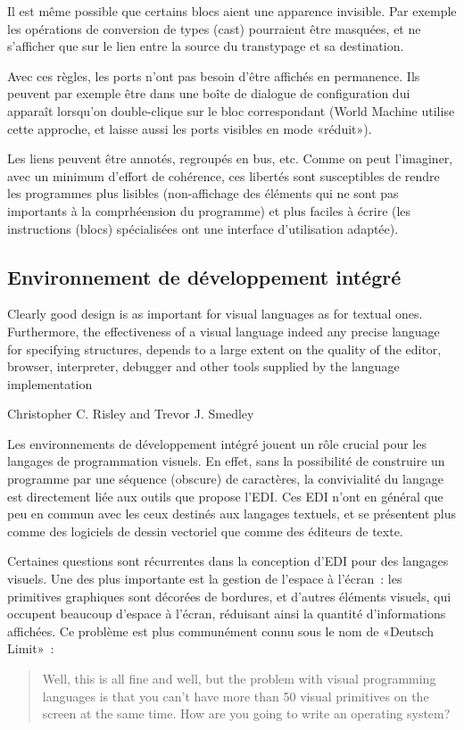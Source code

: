 \documentclass{article}
\begin{document}
Il est même possible que certains blocs aient une apparence invisible. Par exemple les opérations de conversion de types (cast) pourraient
être masquées, et ne s'afficher que sur le lien entre la source du transtypage et sa destination.

Avec ces règles, les ports n'ont pas besoin d'être affichés en permanence. Ils peuvent par exemple être dans une boîte de dialogue de
configuration dui apparaît lorsqu'on double-clique sur le bloc correspondant (World Machine utilise cette approche, et laisse aussi les
ports visibles en mode «réduit»).

Les liens peuvent être annotés, regroupés en bus, etc. Comme on peut l'imaginer, avec un minimum d'effort de cohérence, ces libertés sont
susceptibles de rendre les programmes plus lisibles (non-affichage des éléments qui ne sont pas importants à la comprhéension du programme)
et plus faciles à écrire (les instructions (blocs) spécialisées ont une interface d'utilisation adaptée).

\subsection{Environnement de développement intégré}

{
  \setlength{\epigraphwidth}{0.85\linewidth}
  \renewcommand{\textflush}{justify}
  \renewcommand{\epigraphflush}{center}
  \epigraph{
    Clearly good design is as important for visual languages as for textual ones. Furthermore, the effectiveness of a visual language indeed
    any precise language for specifying structures, depends to a large extent on the quality of the editor, browser, interpreter, debugger and
    other tools supplied by the language implementation
  }{Christopher C. Risley and Trevor J. Smedley \cite{the-editor-is-as-important-as-the-language}}
}

Les environnements de développement intégré jouent un rôle crucial pour les langages de programmation visuels. En effet, sans la possibilité
de construire un programme par une séquence (obscure) de caractères, la convivialité du langage est directement liée aux outils que propose
l'EDI. Ces EDI n'ont en général que peu en commun avec les ceux destinés aux langages textuels, et se présentent plus comme des logiciels de
dessin vectoriel que comme des éditeurs de texte.

Certaines questions sont récurrentes dans la conception d'EDI pour des langages visuels. Une des plus importante est la gestion de l'espace
à l'écran~: les primitives graphiques sont décorées de bordures, et d'autres éléments visuels, qui occupent beaucoup d'espace à l'écran,
réduisant ainsi la quantité d'informations affichées. Ce problème est plus communément connu sous le nom de «Deutsch
Limit»\cite{deutsch-limit}~:
\begin{quotation}
  Well, this is all fine and well, but the problem with visual programming languages is that you can’t have more than 50 visual primitives
  on the screen at the same time. How are you going to write an operating system?
\end{quotation}
\end{document}
